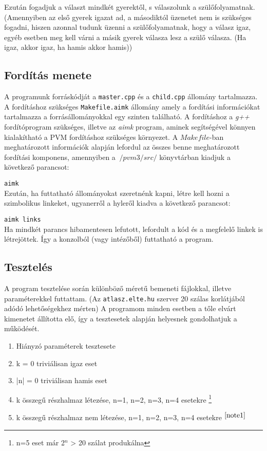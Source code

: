 \documentclass[12pt]{article}
\begin{document}
Ezután fogadjuk a választ mindkét gyerektől, s válaszolunk a szülőfolyamatnak. (Amennyiben az első gyerek igazat ad, a másodiktól üzenetet nem is szükséges fogadni, hiszen azonnal tudunk üzenni a szülőfolyamatnak, hogy a válasz igaz, egyéb esetben meg kell várni a másik gyerek válasza lesz a szülő válasza. (Ha igaz, akkor igaz, ha hamis akkor hamis))
    
\subsection{Fordítás menete}

A programunk forráskódját a \verb|master.cpp| és a \verb|child.cpp| állomány tartalmazza. A fordításhoz szükséges \verb|Makefile.aimk| állomány amely a fordítási információkat tartalmazza a forrásállományokkal egy szinten található.
A fordításhoz a \textit{g++} fordítóprogram szükséges, illetve az \textit{aimk} program, aminek segítségével könnyen kialakítható a PVM fordításhoz szükséges környezet. A $Makefile$-ban meghatározott információk alapján lefordul az összes benne meghatározott fordítási komponens, amennyiben a $~/pvm3/src/$ könyvtárban kiadjuk a következő parancsot:

\verb|aimk| \\
Ezután, ha futtatható állományokat szeretnénk kapni, létre kell hozni a szimbolikus linkeket, ugyanerről a hyleről kiadva a következő parancsot:

\verb|aimk links|\\
Ha mindkét parancs hibamentesen lefutott, lefordult a kód és a megfelelő linkek is létrejöttek. Így a konzolból (vagy intézőből) futtatható a program.

\subsection{Tesztelés}

A program tesztelése során különböző méretű bemeneti fájlokkal, illetve paraméterekkel futtattam. (Az \verb|atlasz.elte.hu| szerver 20 szálas korlátjából adódó lehetőségekhez mérten)
A programom minden esetben a tőle elvárt kimenetet állította elő, így a tesztesetek alapján helyesnek gondolhatjuk a működését.

\begin{enumerate}
    \item Hiányzó paraméterek tesztesete
    \item k = 0 triviálisan igaz eset
    \item |n| = 0 triviálisan hamis eset
    \item k összegű részhalmaz létezése, n=1, n=2, n=3, n=4 esetekre \footnote{ \label{note1} n=5 eset már 2$^n$ > 20 szálat produkálna}    \item k összegű részhalmaz nem létezése, n=1, n=2, n=3, n=4 esetekre $^{\ref{note1}}$
\end{enumerate}
\end{document}
